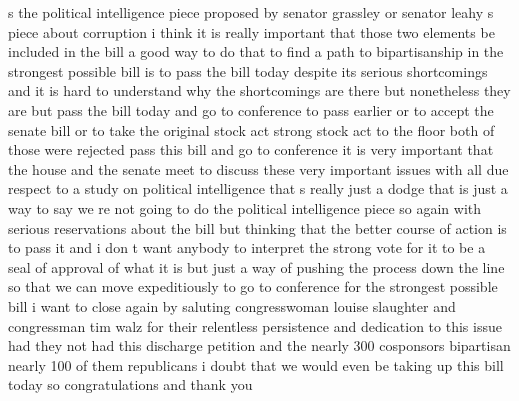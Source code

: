 \documentclass{article}
\begin{document}
s the political intelligence piece proposed by senator grassley or senator leahy s piece about corruption i think it is really important that those two elements be included in the bill a good way to do that to find a path to bipartisanship in the strongest possible bill is to pass the bill today despite its serious shortcomings and it is hard to understand why the shortcomings are there but nonetheless they are but pass the bill today and go to conference to pass earlier or to accept the senate bill or to take the original stock act strong stock act to the floor both of those were rejected pass this bill and go to conference it is very important that the house and the senate meet to discuss these very important issues with all due respect to a study on political intelligence that s really just a dodge that is just a way to say we re not going to do the political intelligence piece so again with serious reservations about the bill but thinking that the better course of action is to pass it and i don t want anybody to interpret the strong vote for it to be a seal of approval of what it is but just a way of pushing the process down the line so that we can move expeditiously to go to conference for the strongest possible bill i want to close again by saluting congresswoman louise slaughter and congressman tim walz for their relentless persistence and dedication to this issue had they not had this discharge petition and the nearly 300 cosponsors bipartisan nearly 100 of them republicans i doubt that we would even be taking up this bill today so congratulations and thank you\pagebreak
\end{document}
